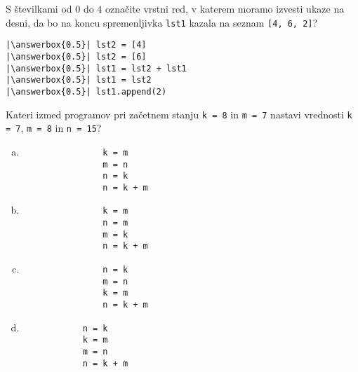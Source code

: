 \documentclass[arhiv, 10pt]{../izpit}
\newcommand{\inlinepy}[1]{\texttt{#1}}
\newcommand{\answerbox}[1]{\framebox{\vphantom{\large M}\hspace{#1cm}}}
\begin{document}
        \naloga*
        \begin{multicols}{2}
        \noindent 
        S številkami od $0$ do $4$ označite vrstni red, v katerem moramo izvesti ukaze na desni, da bo na koncu spremenljivka \inlinepy{lst1} kazala na seznam \inlinepy{[4, 6, 2]}?
    
        \columnbreak
        \noindent
        \begin{verbatim}
|\answerbox{0.5}| lst2 = [4]
|\answerbox{0.5}| lst2 = [6]
|\answerbox{0.5}| lst1 = lst2 + lst1
|\answerbox{0.5}| lst1 = lst2
|\answerbox{0.5}| lst1.append(2)

        \end{verbatim}
        \end{multicols}
    
            
        \naloga*
        
        Kateri izmed programov pri začetnem stanju
            \inlinepy{k = 8} in
            \inlinepy{m = 7}
        nastavi vrednosti
            \inlinepy{k = 7},
            \inlinepy{m = 8} in
            \inlinepy{n = 15}?
    
        \begin{multicols}{4}
        \begin{enumerate}[(a)]
\item 
                \begin{verbatim}
                k = m
                m = n
                n = k
                n = k + m
                \end{verbatim}
            
\item 
                \begin{verbatim}
                k = m
                n = m
                m = k
                n = k + m
                \end{verbatim}
            
\item 
                \begin{verbatim}
                n = k
                m = n
                k = m
                n = k + m
                \end{verbatim}
            
\item 
            \begin{verbatim}
            n = k
            k = m
            m = n
            n = k + m
            \end{verbatim}
        
\end{enumerate}

        \end{multicols}
    
\end{document}
